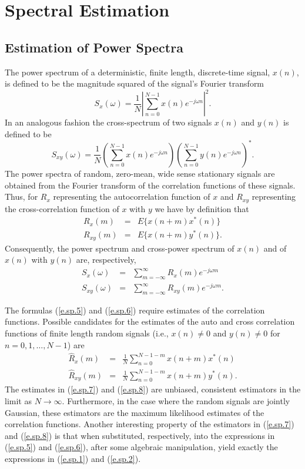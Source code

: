 \chapter{Spectral Estimation}
\section{Estimation of Power Spectra}

	The power spectrum of a deterministic,
finite length, discrete-time signal, $x(n)$, is defined to
be the magnitude squared of the signal's Fourier transform
%
\begin{equation}
S_x(\omega)=\frac{1}{N}|\sum_{n=0}^{N-1}x(n)e^{-j\omega n}|^2.
\label{e.sp.1}
\end{equation}
%
In an analogous fashion the cross-spectrum of two signals 
$x(n)$ and $y(n)$ is defined to be
%
\begin{equation}
S_{xy}(\omega)=\frac{1}{N}(\sum_{n=0}^{N-1}x(n)e^{-j\omega n})(\sum_{n=0}^{N-1}y(n)e^{-j\omega n})^*.
\label{e.sp.2}
\end{equation}
%
The power spectra of random, zero-mean, wide sense stationary signals
are obtained from the Fourier transform of the correlation functions
of these signals.  Thus, for $R_x$ representing the autocorrelation
function of $x$ and $R_{xy}$ representing the cross-correlation function of
$x$ with $y$ we have by definition that
%
\begin{eqnarray}
R_x(m)&=&E\{x(n+m)x^*(n)\}\label{e.sp.3}\\
R_{xy}(m)&=&E\{x(n+m)y^*(n)\}.
\label{e.sp.4}
\end{eqnarray}
%
Consequently, the power spectrum and cross-power spectrum 
of $x(n)$ and of $x(n)$ with $y(n)$ are, respectively,
%
\begin{eqnarray}
S_x(\omega)&=&\sum_{m=-\infty}^{\infty}R_x(m)e^{-j\omega m}
\label{e.sp.5}\\
S_{xy}(\omega)&=&\sum_{m=-\infty}^{\infty}R_{xy}(m)e^{-j\omega m}.
\label{e.sp.6}
\end{eqnarray}
%

The formulas (\ref{e.sp.5}) and (\ref{e.sp.6})  require estimates of 
the correlation functions.
Possible candidates for the estimates of the auto and cross
correlation functions of finite length random signals
(i.e., $x(n)\ne0$ and $y(n)\ne0$ for $n=0,1,\ldots,N-1$) are
%
\begin{eqnarray}
\hat{R}_x(m)&=&\frac{1}{N}\sum_{n=0}^{N-1-m}x(n+m)x^*(n)
\label{e.sp.7}\\
\hat{R}_{xy}(m)&=&\frac{1}{N}\sum_{n=0}^{N-1-m}x(n+m)y^*(n).
\label{e.sp.8}
\end{eqnarray}
%
The estimates in (\ref{e.sp.7}) and (\ref{e.sp.8}) are unbiased, 
consistent estimators in the limit as $N\rightarrow\infty$.  
Furthermore, in the 
case where the random signals are jointly Gaussian, these
estimators are the maximum likelihood estimates of the correlation
functions.  Another interesting property of 
the estimators in (\ref{e.sp.7}) and (\ref{e.sp.8}) is that
when substituted, respectively, into the expressions in 
(\ref{e.sp.5}) and (\ref{e.sp.6}), after some algebraic
manipulation, yield exactly the expressions in (\ref{e.sp.1})
and (\ref{e.sp.2}).

